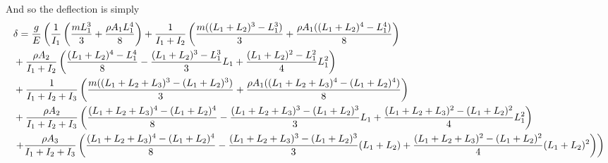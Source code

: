 \documentclass[11pt, fleqn]{article}
\begin{document}
And so the deflection is simply
\begin{align*}
    &\delta=\frac{g}{E}\left(\frac{1}{I_1}\left( \frac{mL_1^3}{3}+\frac{\rho A_1L_1^4}{8} \right)+\frac{1}{I_1+I_2}\left( \frac{m((L_1+L_2)^3-L_1^3)}{3}+\frac{\rho A_1((L_1+L_2)^4-L_1^4)}{8} \right)\right.\\
    &+\frac{\rho A_2}{I_1+I_2}\left( \frac{(L_1+L_2)^4-L_1^4}{8}-\frac{(L_1+L_2)^3-L_1^3}{3}L_1+\frac{(L_1+L_2)^2-L_1^2}{4}L_1^2 \right)\\
    &+\frac{1}{I_1+I_2+I_3}\left( \frac{m((L_1+L_2+L_3)^3-(L_1+L_2)^3)}{3}+\frac{\rho A_1((L_1+L_2+L_3)^4-(L_1+L_2)^4)}{8} \right)\\
    &+\frac{\rho A_2}{I_1+I_2+I_3}\left( \frac{(L_1+L_2+L_3)^4-(L_1+L_2)^4}{8}-\frac{(L_1+L_2+L_3)^3-(L_1+L_2)^3}{3}L_1+\frac{(L_1+L_2+L_3)^2-(L_1+L_2)^2}{4}L_1^2 \right)\\
    &\left.+\frac{\rho A_3}{I_1+I_2+I_3}\left( \frac{(L_1+L_2+L_3)^4-(L_1+L_2)^4}{8}-\frac{(L_1+L_2+L_3)^3-(L_1+L_2)^3}{3}(L_1+L_2)+\frac{(L_1+L_2+L_3)^2-(L_1+L_2)^2}{4}(L_1+L_2)^2 \right)\right)
\end{align*}
\end{document}
